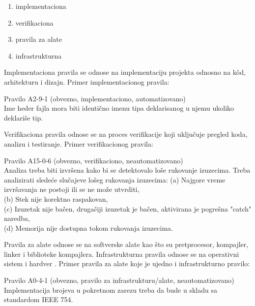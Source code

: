 \documentclass[12pt,oneside]{memoir}
\begin{document}
\begin{itemize}
{\begin{enumerate}
  \item{implementaciona}
  \item{verifikaciona}
  \item{pravila za alate}
  \item{infrastrukturna}
\end{enumerate}

Implementaciona pravila se odnose na implementaciju projekta odnosno na k\^{o}d, arhitekturu i dizajn.
Primer implementacionog pravila:

\begin{center}
\begin{tcolorbox}
Pravilo A2-9-1 (obvezno, implementaciono, automatizovano) \\
Ime heder fajla mora biti identično imenu tipa deklarisanog u njemu ukoliko deklariše tip.
\end{tcolorbox}
\end{center}


Verifikaciona pravila odnose se na proces verifikacije koji uključuje pregled koda, analizu i testiranje.
Primer verifikacionog pravila:

\begin{center}
\begin{tcolorbox}
Pravilo A15-0-6 (obvezno, verifikaciono, neautomatizovano) \\
Analiza treba biti izvršena kako bi se detektovalo loše rukovanje izuzecima. Treba analizirati slede\'ce slučajeve lošeg rukovanja izuzecima:
(a) Najgore vreme izvršavanja ne postoji ili se ne može utvrditi, \\
(b) Stek nije korektno raspakovan, \\
(c) Izuzetak nije bačen, drugačiji izuzetak je bačen, aktivirana je pogre\v{s}na "catch" naredba, \\
(d) Memorija nije dostupna tokom rukovanja izuzecima.
\end{tcolorbox}
\end{center}

Pravila za alate odnose se na softverske alate kao što su pretprocesor, kompajler, linker i biblioteke kompajlera.
Infrastrukturna pravila odnose se na operativni sistem i hardver \cite{AutosarGuidelines}.
Primer pravila za alate koje je ujedno i infrastrukturno pravilo:

\begin{center}
\begin{tcolorbox}
Pravilo A0-4-1 (obvezno, pravilo za infrastrukturu/alate, neautomatizovano) \\
Implementacija brojeva u pokretnom zarezu treba da bude u skladu sa standardom IEEE 754.
\end{tcolorbox}
\end{center}

}
\end{itemize}
\end{document}
